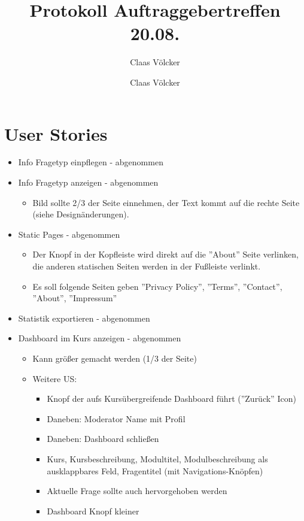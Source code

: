 \documentclass[colorback, accentcolor=tud1c, paper=a4]{tudexercise}
\title{Protokoll Auftraggebertreffen 20.08.}
\subtitle{Claas Völcker}
\author{Claas Völcker}
\begin{document}
\maketitle

\section*{User Stories}
\begin{multicols}{2}
\begin{itemize}
	\item Info Fragetyp einpflegen - abgenommen
	\item Info Fragetyp anzeigen - abgenommen
	\begin{itemize}
		\item Bild sollte 2/3 der Seite einnehmen, der Text kommt auf die rechte Seite (siehe Designänderungen). 
	\end{itemize}
	\item Static Pages - abgenommen
	\begin{itemize}
		\item Der Knopf in der Kopfleiste wird direkt auf die ''About'' Seite verlinken, die anderen statischen Seiten werden in der Fußleiste verlinkt.
		\item Es soll folgende Seiten geben ''Privacy Policy'', ''Terms'', ''Contact'', ''About'', ''Impressum''
	\end{itemize}
	\item Statistik exportieren - abgenommen
	\item Dashboard im Kurs anzeigen - abgenommen
	\begin{itemize}
		\item Kann größer gemacht werden (1/3 der Seite)
		\item Weitere US:
		\begin{itemize}
			\item Knopf der aufs Kursübergreifende Dashboard führt (''Zurück'' Icon)
			\item Daneben: Moderator Name mit Profil
			\item Daneben: Dashboard schließen
			\item Kurs, Kursbeschreibung, Modultitel, Modulbeschreibung als ausklappbares Feld, Fragentitel (mit Navigations-Knöpfen)
			\item Aktuelle Frage sollte auch hervorgehoben werden
			\item Dashboard Knopf kleiner
		\end{itemize}
	\end{itemize}

\end{itemize}
\end{multicols}
\end{document}
